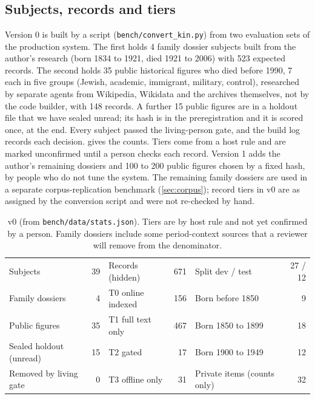\section{\bench}
\label{sec:bench}

\subsection{Subjects, records and tiers}
Version 0 is built by a script (\texttt{bench/convert\_kin.py}) from two evaluation sets of the production system. The first holds 4 family dossier subjects built from the author's research (born 1834 to 1921, died 1921 to 2006) with 523 expected records. The second holds 35 public historical figures who died before 1990, 7 each in five groups (Jewish, academic, immigrant, military, control), researched by separate agents from Wikipedia, Wikidata and the archives themselves, not by the code builder, with 148 records. A further 15 public figures are in a holdout file that we have sealed unread; its hash is in the preregistration and it is scored once, at the end. Every subject passed the living-person gate, and the build log records each decision.  gives the counts. Tiers come from a host rule and are marked unconfirmed until a person checks each record. Version 1 adds the author's remaining dossiers and 100 to 200 public figures chosen by a fixed hash, by people who do not tune the system. The remaining family dossiers are used in a separate corpus-replication benchmark (\cref{sec:corpus}); record tiers in v0 are as assigned by the conversion script and were not re-checked by hand.

\begin{table}[t]
\centering\small
\begin{tabular}{@{}lr@{\qquad}lr@{\qquad}lr@{}}
\toprule
Subjects & 39 & Records (hidden) & 671 & Split dev / test & 27 / 12 \\
Family dossiers & 4 & T0 online indexed & 156 & Born before 1850 & 9 \\
Public figures & 35 & T1 full text only & 467 & Born 1850 to 1899 & 18 \\
Sealed holdout (unread) & 15 & T2 gated & 17 & Born 1900 to 1949 & 12 \\
Removed by living gate & 0 & T3 offline only & 31 & Private items (counts only) & 32 \\
\bottomrule
\end{tabular}
\caption{\bench v0 (from \texttt{bench/data/stats.json}). Tiers are by host rule and not yet confirmed by a person. Family dossiers include some period-context sources that a reviewer will remove from the denominator.}
\label{tab:data}
\end{table}


